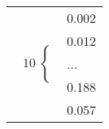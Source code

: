 
\begin{tabular}{l|l|}
\cline{2-2}
\multirow{5}{*}{\hspace{-1em}$\left.\begin{array}{l}\\ \\ \\ \\ \\ \end{array}10\right\lbrace$} & 0.002 \\ \cline{2-2} 
                   & 0.012 \\ \cline{2-2} 
                   & ...   \\ \cline{2-2} 
                   & 0.188 \\ \cline{2-2} 
                   & 0.057 \\ \cline{2-2} 
\end{tabular}